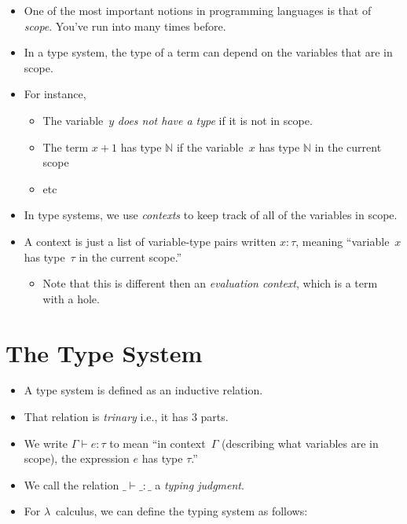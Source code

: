 \documentclass{lecturenotes}
\begin{document}
\begin{itemize}
\item One of the most important notions in programming languages is that of \emph{scope}.
  You've run into many times before.
\item In a type system, the type of a term can depend on the variables that are in scope.
\item For instance,
  \begin{itemize}
  \item The variable~$y$ \emph{does not have a type} if it is not in scope.
  \item The term $x + 1$ has type $\mathbb{N}$ if the variable~$x$ has type $\mathbb{N}$ in the current scope
  \item etc
  \end{itemize}
\item In type systems, we use \emph{contexts} to keep track of all of the variables in scope.
\item A context is just a list of variable-type pairs written $x \colon \tau$, meaning ``variable~$x$ has type~$\tau$ in the current scope.''
  \begin{syntax}
    \category[Contexts]{\Gamma} \alternative{\cdot} 
  \end{syntax}
  \begin{itemize}
  \item Note that this is different then an \emph{evaluation context}, which is a term with a hole.
  \end{itemize}
\end{itemize}

\section{The Type System}
\label{sec:type-system}

\begin{itemize}
\item A type system is defined as an inductive relation.
\item That relation is \emph{trinary} i.e., it has $3$ parts.
\item We write $\Gamma \vdash e \colon \tau$ to mean ``in context~$\Gamma$ (describing what variables are in scope), the expression $e$ has type $\tau$.''
\item We call the relation $\_\vdash\_\colon\_$ a \emph{typing judgment}.
\item For $\lambda$~calculus, we can define the typing system as follows:
\end{itemize}
\end{document}
